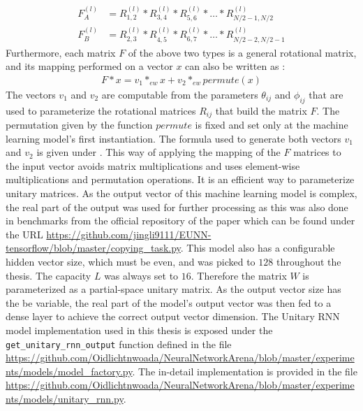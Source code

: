 \documentclass[draft,final]{vutinfth} %
\begin{document}
    \begin{align}
        F_A^{(l)} &= R_{1,2}^{(l)} * R_{3,4}^{(l)} * R_{5,6}^{(l)} * \ldots * R_{N/2-1,N/2}^{(l)} \\
        F_B^{(l)} &= R_{2,3}^{(l)} * R_{4,5}^{(l)} * R_{6,7}^{(l)} * \ldots * R_{N/2-2,N/2-1}^{(l)}
    \end{align}
    Furthermore, each matrix $F$ of the above two types is a general rotational matrix, and its mapping performed on a vector $x$ can also be written as \cite[p. 4]{EfficientUnitaryRNNs}:
    \begin{align}
        F*x = v_1 *_{ew} x + v_2 *_{ew} permute(x)
    \end{align}
    The vectors $v_1$ and $v_2$ are computable from the parameters $\theta_{ij}$ and $\phi_{ij}$ that are used to parameterize the rotational matrices $R_{ij}$ that build the matrix $F$.
    The permutation given by the function $permute$ is fixed and set only at the machine learning model's first instantiation.
    The formula used to generate both vectors $v_1$ and $v_2$ is given under \cite[p. 4]{EfficientUnitaryRNNs}.
    This way of applying the mapping of the $F$ matrices to the input vector avoids matrix multiplications and uses element-wise multiplications and permutation operations. It is an efficient way to parameterize unitary matrices.
    As the output vector of this machine learning model is complex, the real part of the output was used for further processing as this was also done in benchmarks from the official repository of the paper \cite{EfficientUnitaryRNNs} which can be found under the URL \url{https://github.com/jingli9111/EUNN-tensorflow/blob/master/copying_task.py}.
    This model also has a configurable hidden vector size, which must be even, and was picked to $128$ throughout the thesis.
    The capacity $L$ was always set to $16$. Therefore the matrix $W$ is parameterized as a partial-space unitary matrix.
    As the output vector size has the be variable, the real part of the model's output vector was then fed to a dense layer to achieve the correct output vector dimension.
    The Unitary RNN model implementation used in this thesis is exposed under the \texttt{get\_unitary\_rnn\_output} function defined in the file \url{https://github.com/Oidlichtnwoada/NeuralNetworkArena/blob/master/experiments/models/model_factory.py}.
    The in-detail implementation is provided in the file \url{https://github.com/Oidlichtnwoada/NeuralNetworkArena/blob/master/experiments/models/unitary_rnn.py}.
\end{document}
